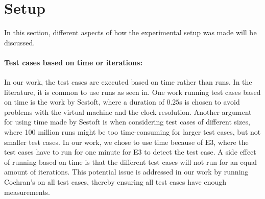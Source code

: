 \section{Setup}

In this section, different aspects of how the experimental setup was made will be discussed.

\paragraph*{Test cases based on time or iterations:} In our work, the test cases are executed based on time rather than runs. In the literature, it is common to use runs as seen in\cite[]{Pereira2017,Koedijk2022diff,Georgiou2020}. One work running test cases based on time is the work by Sestoft\cite[]{sestoft2013microbenchmarks}, where a duration of $0.25$s is chosen to avoid problems with the virtual machine and the clock resolution. Another argument for using time made by Sestoft\cite[]{sestoft2013microbenchmarks} is when considering test cases of different sizes, where 100 million runs might be too time-consuming for larger test cases, but not smaller test cases. In our work, we chose to use time because of E3, where the test cases have to run for one minute for E3 to detect the test case. A side effect of running based on time is that the different test cases will not run for an equal amount of iterations. This potential issue is addressed in our work by running Cochran's on all test cases, thereby ensuring all test cases have enough measurements. 



